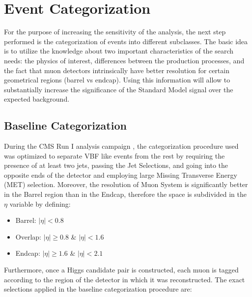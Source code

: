 \section{Event Categorization}\label{section:higgs_categorization}
For the purpose of increasing the sensitivity of the analysis, the next step performed is the categorization of events into different subclasses. The basic idea is to utilize the knowledge about two important characteristics of the search needs: the physics of interest, differences between the production processes, and the fact that muon detectors intrinsically have better resolution for certain geometrical regions (barrel vs endcap). Using this information will allow to substantially increase the significance of the Standard Model signal over the expected background.

\subsection{Baseline Categorization}
During the CMS Run I analysis campaign \cite{CMSHiggsRunI}, the categorization procedure used was optimized to separate VBF like events from the rest by requiring the presence of at least two jets, passing the Jet Selections, and going into the opposite ends of the detector and employing large Missing Transverse Energy (MET) selection. Moreover, the resolution of Muon System is significantly better in the Barrel region than in the Endcap, therefore the space is subdivided in the $\eta$ variable by defining:
\begin{itemize}
  \item Barrel: $|\eta| < 0.8$
  \item Overlap: $|\eta| \ge 0.8$ \& $|\eta| < 1.6$
  \item Endcap: $|\eta| \ge 1.6$ \& $|\eta| < 2.1$
\end{itemize}
Furthermore, once a Higgs candidate pair is constructed, each muon is tagged according to the region of the detector in which it was reconstructed. The exact selections applied in the baseline categorization procedure are:
